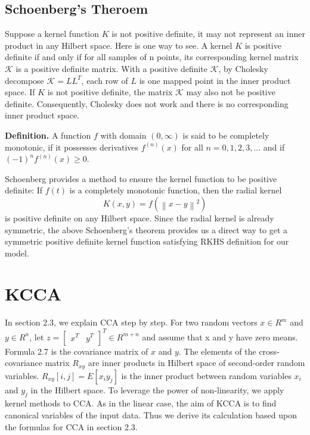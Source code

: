 \documentclass[12pt]{report} %
\newcommand{\norm}[1]{\left\lVert #1 \right\rVert}
\begin{document}
\subsection{Schoenberg's Theroem}
Suppose a kernel function $K$ is not positive definite, it may not represent an inner product in any Hilbert space. Here is one way to see. A kernel $K$ is positive definite if and only if for all samples of n points, its corresponding kernel matrix $\mathcal{K}$ is a positive definite matrix. With a positive definite $\mathcal{K}$, by Cholesky decompose $\mathcal{K}=LL^T$, each row of $L$ is one mapped point in the inner product space. If $K$ is not positive definite, the matrix $\mathcal{K}$ may also not be positive definite. Consequently, Cholesky does not work and there is no corresponding inner product space. 

\textbf{Definition.} A function $f$ with domain $(0, \infty)$ is said to be completely monotonic, if it possesses derivatives $f^{(n)}(x)$ for all $n=0,1,2,3,...$ and if $(-1)^nf^{(n)}(x) \geq 0$\cite{CMF}. 

Schoenberg\cite{Schoenberg} provides a method to ensure the kernel function to be positive definite: If \(f(t)\) is a completely monotonic function, then the radial kernel
\begin{equation}
K(x,y)=f(\norm{x-y}^2)
\end{equation}
is positive definite on any Hilbert space. Since the radial kernel is already symmetric, the above Schoenberg's theorem provides us a direct way to get a symmetric positive definite kernel function satisfying RKHS definition for our model.

\section{KCCA}
In section 2.3, we explain CCA step by step. For two random vectors $x\in R^{m}$ and $y\in R^{n}$, let $z= \begin{bmatrix}x^T & y^T\end{bmatrix}^T \in R^{m+n}$ and assume that x and y have zero means. Formula 2.7 is the covariance matrix of $x$ and $y$. The elements of the cross-covariance matrix $R_{xy}$ are inner products in Hilbert space of second-order random variables. $R_{xy}[i,j]=E[x_{i}y_{j}]$ is the inner product between random variables $x_{i}$ and $y_{j}$ in the Hilbert space. To leverage the power of non-linearity, we apply kernel methods to CCA. As in the linear case, the aim of KCCA is to find canonical variables of the input data. Thus we derive its calculation based upon the formulas for CCA in section 2.3. 
\end{document}
